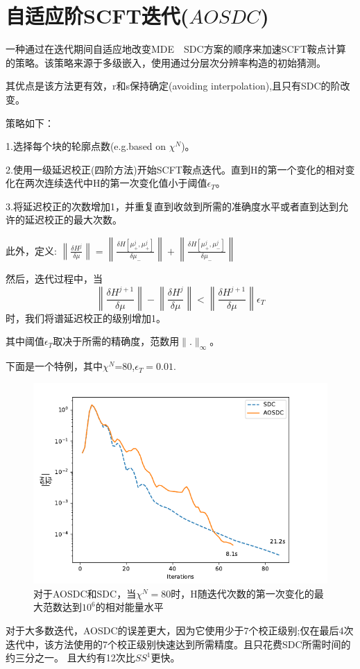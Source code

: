 \section{自适应阶SCFT迭代($AOSDC$)}
一种通过在迭代期间自适应地改变MDE$\quad$SDC方案的顺序来加速SCFT鞍点计算的策略。该策略来源于多级嵌入，使用通过分层次分辨率构造的初始猜测。

其优点是该方法更有效，r和s保持确定(avoiding interpolation),且只有SDC的阶改变。

策略如下：

1.选择每个块的轮廓点数(e.g.based on $\chi^N$)。

2.使用一级延迟校正(四阶方法)开始SCFT鞍点迭代。直到H的第一个变化的相对变化在两次连续迭代中H的第一次变化值小于阈值$\epsilon_{T}$。

3.将延迟校正的次数增加1，并重复直到收敛到所需的准确度水平或者直到达到允许的延迟校正的最大次数。

此外，定义:
$\left\|\frac{\delta H^{j}}{\delta \mu}\right\|=\left\|\frac{\delta H\left[\mu_{+}^{j}, \mu_{+}^{j}\right]}{\delta \mu_{-}}\right\|+\left\|\frac{\delta H\left[\mu_{+}^{j}, \mu_{-}^{j}\right]}{\delta \mu_{-}}\right\|$

然后，迭代过程中，当$$
\left\|\frac{\delta H^{j+1}}{\delta \mu}\right\|-\left\|\frac{\delta H^{j}}{\delta \mu}\right\|<\left\|\frac{\delta H^{j+1}}{\delta \mu}\right\| \epsilon_{T}
$$时，我们将谱延迟校正的级别增加1。

其中阈值$\epsilon_{T}$取决于所需的精确度，范数用$\lVert .\rVert_{\infty}$。

下面是一个特例，其中$\chi^N$=80,$\epsilon_{T}=0.01$.
\begin{figure}[ht]
	\centering
	\includegraphics[scale=0.5]{10.png}
	\caption{对于AOSDC和SDC，当$\chi^N=80$时，H随迭代次数的第一次变化的最大范数达到$10^6$的相对能量水平}
	\label{fig:pathdemo}
\end{figure}


对于大多数迭代，AOSDC的误差更大，因为它使用少于7个校正级别;仅在最后4次迭代中，该方法使用的7个校正级别快速达到所需精度。且只花费SDC所需时间的约三分之一。
且大约有12次比$SS^1$更快。
